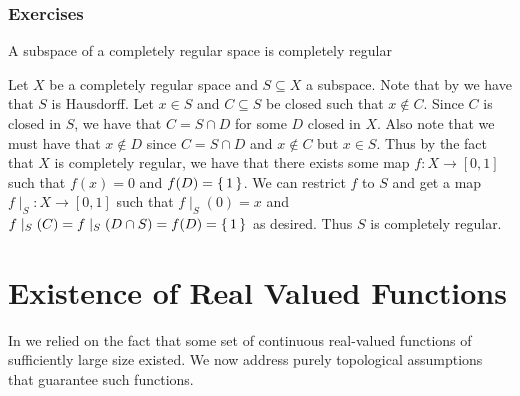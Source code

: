 \documentclass[letterpaper, 11pt, oneside]{book}
\begin{document}
\subsection*{Exercises}

\begin{exercise}
  A subspace of a completely regular space is completely regular
\end{exercise}
\begin{pf}
  Let $X$ be a completely regular space and $S \subseteq X$ a subspace.
  Note that by  we have that $S$ is Hausdorff.
  Let $x \in S$ and $C \subseteq S$ be closed such that $x \notin C$.
  Since $C$ is closed in $S$, we have that $C = S \cap D$ for some $D$ closed in $X$.
  Also note that we must have that $x \notin D$ since $C = S \cap D$ and $x \notin C$ but $x \in S$.
  Thus by the fact that $X$ is completely regular, we have that there exists some map $f\colon X \to [0, 1]$ such that $f(x) = 0$ and $f(D) = \set{1}$.
  We can restrict $f$ to $S$ and get a map $f\mid_{S}\colon X \to [0, 1]$ such that $f\mid_{S}(0) = x$ and $f\mid_{S}(C) = f\mid_{S}(D \cap S) = f(D) = \set{1}$ as desired.
  Thus $S$ is completely regular.
\end{pf}

\clearpage

\chapter{Existence of Real Valued Functions}

In  we relied on the fact that some set of continuous real-valued functions of sufficiently large size existed.
We now address purely topological assumptions that guarantee such functions.
\end{document}
